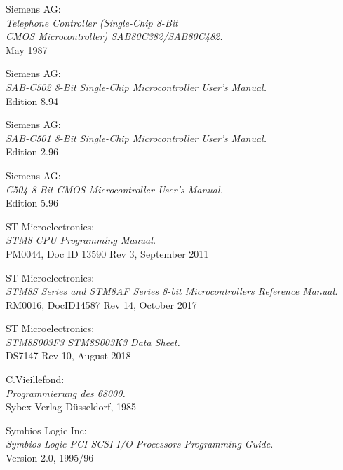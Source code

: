  Siemens AG: \\
                  {\em Telephone Controller (Single-Chip 8-Bit \\
                  CMOS Microcontroller) SAB80C382/SAB80C482.\/}\\
                  May 1987

 Siemens AG: \\
                  {\em SAB-C502 8-Bit Single-Chip Microcontroller User's
                   Manual.\/} \\
                  Edition 8.94

 Siemens AG: \\
                  {\em SAB-C501 8-Bit Single-Chip Microcontroller User's
                   Manual.\/} \\
                  Edition 2.96

 Siemens AG: \\
                  {\em C504 8-Bit CMOS Microcontroller User's Manual.\/} \\
                  Edition 5.96

 ST Microelectronics: \\
                  {\em STM8 CPU Programming Manual.\/} \\
                  PM0044, Doc ID 13590 Rev 3, September 2011

 ST Microelectronics: \\
                  {\em STM8S Series and STM8AF Series 8-bit Microcontrollers Reference Manual.\/} \\
                  RM0016, DocID14587 Rev 14, October 2017

 ST Microelectronics: \\
                  {\em STM8S003F3 STM8S003K3 Data Sheet.\/} \\
                  DS7147 Rev 10, August 2018

 C.Vieillefond: \\
                 {\em Programmierung des 68000.\/} \\
                 Sybex-Verlag D\"usseldorf, 1985

 Symbios Logic Inc: \\
                 {\em Symbios Logic PCI-SCSI-I/O Processors Programming   
                 Guide.\/} \\
                 Version 2.0, 1995/96
                 
